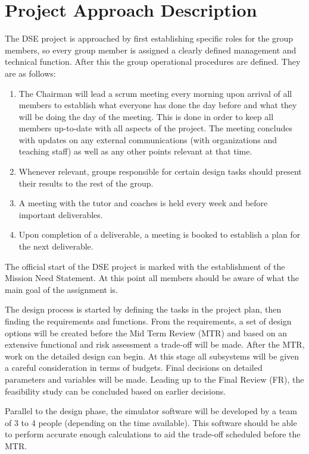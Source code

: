 \section{Project Approach Description}
\label{dseProjectApproachDescription}
The DSE project is approached by first establishing specific roles for the group members, so every group member is assigned a clearly defined management and technical function. After this the group operational procedures are defined. They are as follows:

\begin{enumerate}
	\item The Chairman will lead a scrum meeting every morning upon arrival of all members to establish what everyone has done the day before and what they will be doing the day of the meeting. This is done in order to keep all members up-to-date with all aspects of the project. The meeting concludes with updates on any external communications (with organizations and teaching staff) as well as any other points relevant at that time.
	\item Whenever relevant, groups responsible for certain design tasks should present their results to the rest of the group.
	\item A meeting with the tutor and coaches is held every week and before important deliverables.
	\item Upon completion of a deliverable, a meeting is booked to establish a plan for the next deliverable.  
\end{enumerate}

The official start of the DSE project is marked with the establishment of the Mission Need Statement. At this point all members should be aware of what the main goal of the assignment is.

The design process is started by defining the tasks in the project plan, then finding the requirements and functions. From the requirements, a set of design options will be created before the Mid Term Review (MTR) and based on an extensive functional and risk assessment a trade-off will be made. After the MTR, work on the detailed design can begin. At this stage all subsystems will be given a careful consideration in terms of budgets. Final decisions on detailed parameters and variables will be made. Leading up to the Final Review (FR), the feasibility study can be concluded based on earlier decisions.

Parallel to the design phase, the simulator software will be developed by a team of 3 to 4 people (depending on the time available). This software should be able to perform accurate enough calculations to aid the trade-off scheduled before the MTR.